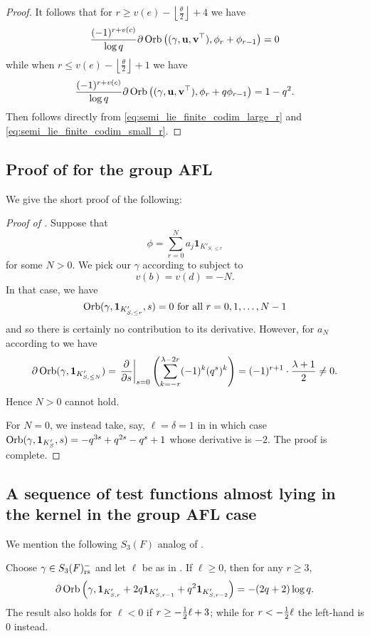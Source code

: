 \begin{proof}
  It follows that for $r \ge v(e) - \left\lfloor \frac{\theta}{2} \right\rfloor + 4$ we have
  \begin{equation}
    \frac{(-1)^{r+v(c)}}{\log q}
    \partial \operatorname{Orb} \left( {(\gamma, \mathbf u, \mathbf v^\top)}, \phi_r + \phi_{r-1} \right) = 0
    \label{eq:semi_lie_finite_codim_large_r}
  \end{equation}
  while when $r \le v(e) - \left\lfloor \frac{\theta}{2} \right\rfloor + 1$ we have
  \begin{equation}
    \frac{(-1)^{r+v(c)}}{\log q}
    \partial \operatorname{Orb} \left( {(\gamma, \mathbf u, \mathbf v^\top)}, \phi_r + q\phi_{r-1} \right)
    = 1-q^2.
    \label{eq:semi_lie_finite_codim_small_r}
  \end{equation}
  Then  follows directly
  from \eqref{eq:semi_lie_finite_codim_large_r} and \eqref{eq:semi_lie_finite_codim_small_r}.
\end{proof}
\subsection{Proof of  for the group AFL}
We give the short proof of the following:
\nogroupkernel*

\begin{proof}[Proof of ]
  Suppose that
  \[ \phi = \sum_{r=0}^N a_j \mathbf{1}_{K'_{S, \le r}} \]
  for some $N > 0$.
  We pick our $\gamma$ according to  subject to
  \[ v(b) = v(d) = -N. \]
  In that case, we have
  \[ \operatorname{Orb}(\gamma, \mathbf{1}_{K'_{S, \le r}}, s) = 0 \text{ for all } r = 0, 1, \dots, N-1 \]
  and so there is certainly no contribution to its derivative.
  However, for $a_N$ according to  we have
  \[
    \partial \operatorname{Orb}(\gamma, \mathbf{1}_{K'_{S, \le N}})
    = \left. \pdv{}{s} \right\rvert_{s=0}
    \left( \sum_{k=-r}^{\lambda-2r} (-1)^k (q^s)^k \right)
    = (-1)^{r+1} \cdot \frac{\lambda+1}{2} \neq 0.
  \]
  Hence $N > 0$ cannot hold.

  For $N=0$, we instead take, say, $\ell = \delta = 1$ in 
  in which case $\operatorname{Orb}(\gamma, \mathbf{1}_{K'_S}, s) = -q^{3s} + q^{2s} - q^s + 1$
  whose derivative is $-2$.
  The proof is complete.
\end{proof}

\subsection{A sequence of test functions almost lying in the kernel in the group AFL case}
We mention the following $S_3(F)$ analog of .
\begin{theorem}
  [A sequence in $\HH(S_3(F))$]
  \label{thm:group_kernel_full}
  Choose $\gamma \in S_3(F)_{\mathrm{rs}}^-$ and let $\ell$ be as in .
  If $\ell \ge 0$, then for any $r \ge 3$,
  \[ \partial \operatorname{Orb}\left(\gamma, \mathbf{1}_{K'_{S, r}} + 2q \mathbf{1}_{K'_{S, r-1}}
    + q^2 \mathbf{1}_{K'_{S, r-2}}\right) = -(2q+2) \log q. \]
  The result also holds for $\ell < 0$ if $r \ge -\frac{1}{2}\ell + 3$;
  while for $r < -\frac{1}{2}\ell$ the left-hand is $0$ instead.
\end{theorem}

